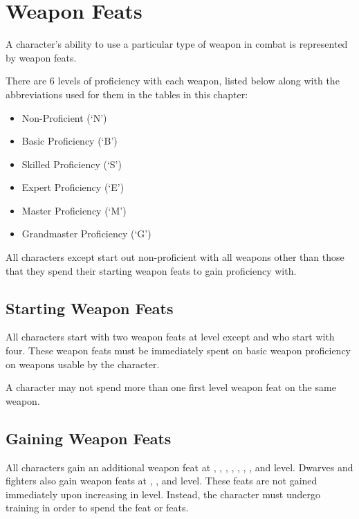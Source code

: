 \chapter[red]{Weapon Feats}
\label{chap:Weapon Feats}
\thispagestyle{plain}

\begin{multicols*}{2}
A character’s ability to use a particular type of weapon in combat is represented by weapon feats.

There are 6 levels of proficiency with each weapon, listed below along with the abbreviations used for them in the tables in this chapter:

\begin{itemize}
	\item{Non-Proficient (‘N’)}
	\item{Basic Proficiency (‘B’)}
	\item{Skilled Proficiency (‘S’)}
	\item{Expert Proficiency (‘E’)}
	\item{Master Proficiency (‘M’)}
	\item{Grandmaster Proficiency (‘G’)}
\end{itemize}

All characters except start out non-proficient with all weapons other than those that they spend their starting weapon feats to gain proficiency with.

\section{Starting Weapon Feats}
All characters start with two weapon feats at  level except  and  who start with four. These weapon feats must be immediately spent on basic weapon proficiency on weapons usable by the character.

A character may not spend more than one first level weapon feat on the same weapon.

\section{Gaining Weapon Feats}
All characters gain an additional weapon feat at , , , , , , , and  level. Dwarves and fighters also gain weapon feats at , , and  level. These feats are not gained immediately upon increasing in level. Instead, the character must undergo training in order to spend the feat or feats.


\end{multicols*}
